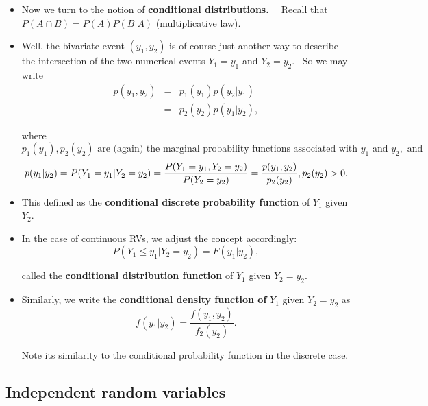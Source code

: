 \documentclass[11pt]{article}
\begin{document}
\begin{itemize}
\item Now we turn to the notion of \textbf{conditional distributions. \ }%
Recall that $P(A\cap B)=P(A)P(B|A)$ (multiplicative law).

\item Well, the bivariate event $(y_{1},y_{2})$ is of course just another
way to describe the intersection of the two numerical events $Y_{1}=y_{1}$
and $Y_{2}=y_{2}.$ \ So we may write%
\begin{eqnarray*}
p(y_{1},y_{2}) &=&p_{1}(y_{1})p(y_{2}|y_{1}) \\
&=&p_{2}(y_{2})p(y_{1}|y_{2}),
\end{eqnarray*}

where%
\begin{equation*}
p_{1}(y_{1}),p_{2}(y_{2})\text{ are (again) the marginal probability
functions associated with }y_{1}\text{ and }y_{2},\text{ and}
\end{equation*}%
\begin{equation*}
p(y_{1}|y_{2})=P(Y_{1}=y_{1}|Y_{2}=y_{2})=\frac{P(Y_{1}=y_{1},Y_{2}=y_{2})}{%
P(Y_{2}=y_{2})}=\frac{p(y_{1},y_{2})}{p_{2}(y_{2})},p_{2}(y_{2})>0.
\end{equation*}

\item This defined as the \textbf{conditional discrete probability function }%
of $Y_{1}$ given $Y_{2}$.

\item In the case of continuous RVs, we adjust the concept accordingly:%
\begin{equation*}
P(Y_{1}\leq y_{1}|Y_{2}=y_{2})=F(y_{1}|y_{2}),
\end{equation*}

called the \textbf{conditional distribution function }of $Y_{1}$ given $%
Y_{2}=y_{2}$.

\item Similarly, we write the \textbf{conditional density function of }$%
Y_{1} $ given $Y_{2}=y_{2}$ as%
\begin{equation*}
f(y_{1}|y_{2})=\frac{f(y_{1},y_{2})}{f_{2}(y_{2})}.
\end{equation*}

Note its similarity to the conditional probability function in the discrete
case.
\end{itemize}

\subsection{Independent random variables}
\end{document}
